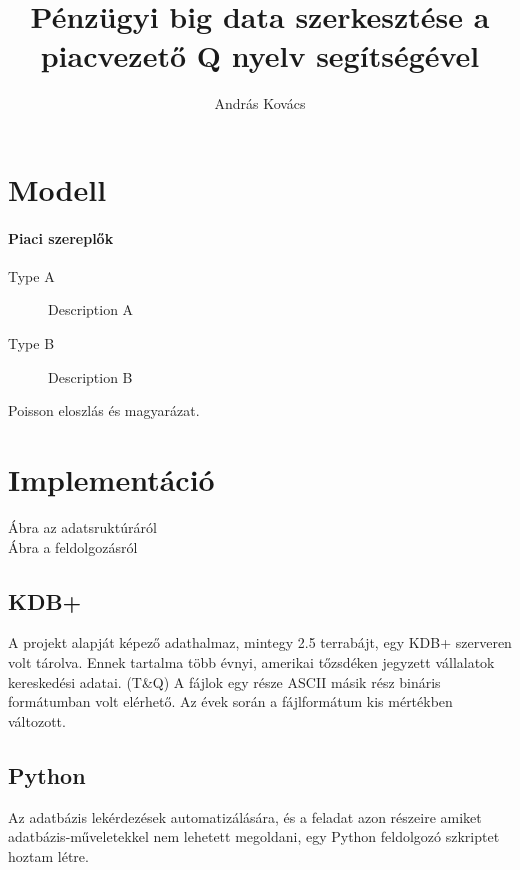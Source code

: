 \documentclass[]{article}
\title{Pénzügyi big data szerkesztése a piacvezető Q nyelv segítségével}
\author{András Kovács}
\begin{document}
\maketitle

\begin{abstract}
	


\end{abstract}

\section{Modell}


\paragraph{Piaci szereplők}

\begin{description}
	\item[Type A] Description A
	\item[Type B] Description B
\end{description}

Poisson eloszlás és magyarázat. 

\section{Implementáció}

\begin{description}
	\item[Ábra az adatsruktúráról] 
	\item[Ábra a feldolgozásról]
\end{description}

\subsection{KDB+}

A projekt alapját képező adathalmaz, mintegy 2.5 terrabájt, egy KDB+ szerveren volt tárolva. Ennek tartalma több évnyi, amerikai tőzsdéken jegyzett vállalatok kereskedési adatai. (T\&Q)
A fájlok egy része ASCII másik rész bináris formátumban volt elérhető. Az évek során a fájlformátum kis mértékben változott.
\subsection{Python}
Az adatbázis lekérdezések automatizálására, és a feladat azon részeire amiket adatbázis-műveletekkel nem lehetett megoldani, egy Python feldolgozó szkriptet hoztam létre. 
\end{document}

